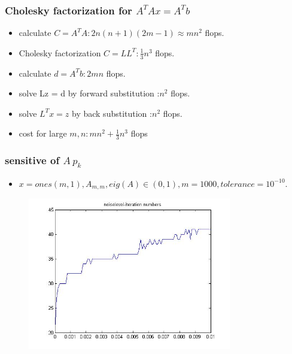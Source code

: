 \documentclass{beamer}
\begin{document}
\begin{frame}
\frametitle{Cholesky factorization for $A^{T}Ax=A^{T}b$}
\begin{itemize}
    \item calculate $C = A^{T}A :2n(n + 1)(2m - 1) \approx mn^{2}$ flops.
    \item Cholesky factorization $C = LL^{T}: \frac{1}{3}n^{3}$ flops.
    \item calculate $d = A^{T}b :2mn$ flops.
    \item solve Lz = d by forward substitution :$n^2$ flops.
    \item solve $L^{T}x = z$ by back substitution :$n^2$ flops.
    \item cost for large $m, n: mn^{2} + \frac{1}{3}n^3$ flops
\end{itemize}
\end{frame}

\begin{frame}
\frametitle{sensitive of $A~p_{k}$}
\begin{itemize}
    \item $x=ones(m,1),A_{m,m}, eig(A)\in (0,1), m=1000, tolerance=10^{-10}$.
\end{itemize}

\begin{figure}[htbp]
\begin{minipage}[b]{0.8\linewidth}
\includegraphics[width=3.5in]{Images/noiselevel_iteration}
\end{minipage}
\end{figure}
\end{frame}
\end{document}
